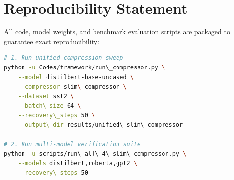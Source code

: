 \section{Reproducibility Statement}
All code, model weights, and benchmark evaluation scripts are packaged to guarantee exact reproducibility:
\begin{lstlisting}[language=bash]
# 1. Run unified compression sweep
python -u Codes/framework/run\_compressor.py \
    --model distilbert-base-uncased \
    --compressor slim\_compressor \
    --dataset sst2 \
    --batch\_size 64 \
    --recovery\_steps 50 \
    --output\_dir results/unified\_slim\_compressor

# 2. Run multi-model verification suite
python -u scripts/run\_all\_4\_slim\_compressor.py \
    --models distilbert,roberta,gpt2 \
    --recovery\_steps 50
\end{lstlisting}
